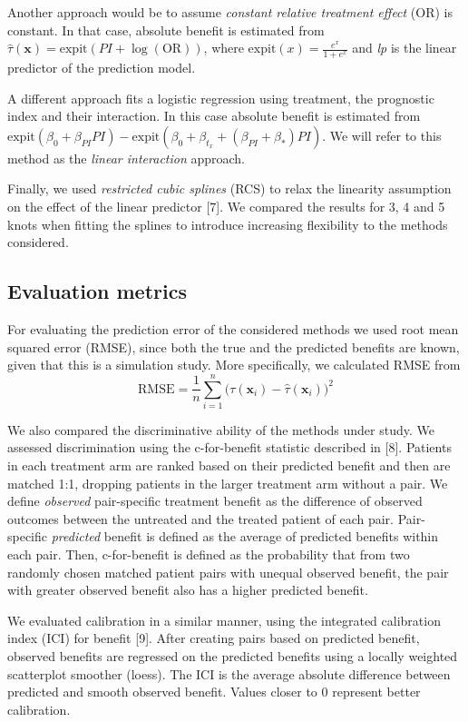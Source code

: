 \documentclass{article}
\begin{document}
Another approach would be to assume \emph{constant relative treatment
effect} (OR) is constant. In that case, absolute benefit is estimated
from \(\hat{\tau}(\bm{x}) = \text{expit}(PI +\log(\text{OR}))\), where
\(\text{expit}(x)=\frac{e^x}{1+e^x}\) and \emph{lp} is the linear
predictor of the prediction model.

A different approach fits a logistic regression using treatment, the
prognostic index and their interaction. In this case absolute benefit is
estimated from
\(\text{expit}(\beta_0+\beta_{PI}PI) - \text{expit}(\beta_0+\beta_{t_x}+(\beta_{PI}+\beta_*)PI)\).
We will refer to this method as the \emph{linear interaction} approach.

Finally, we used \emph{restricted cubic splines} (RCS) to relax the
linearity assumption on the effect of the linear predictor {[}7{]}. We
compared the results for 3, 4 and 5 knots when fitting the splines to
introduce increasing flexibility to the methods considered.

\hypertarget{evaluation-metrics}{%
\subsection{Evaluation metrics}\label{evaluation-metrics}}

For evaluating the prediction error of the considered methods we used
root mean squared error (RMSE), since both the true and the predicted
benefits are known, given that this is a simulation study. More
specifically, we calculated RMSE from
\[\text{RMSE}=\frac{1}{n}\sum_{i=1}^n\big(\tau(\bm{x}_i) - \hat{\tau}(\bm{x}_i)\big)^2\]

We also compared the discriminative ability of the methods under study.
We assessed discrimination using the c-for-benefit statistic described
in {[}8{]}. Patients in each treatment arm are ranked based on their
predicted benefit and then are matched 1:1, dropping patients in the
larger treatment arm without a pair. We define \emph{observed}
pair-specific treatment benefit as the difference of observed outcomes
between the untreated and the treated patient of each pair.
Pair-specific \emph{predicted} benefit is defined as the average of
predicted benefits within each pair. Then, c-for-benefit is defined as
the probability that from two randomly chosen matched patient pairs with
unequal observed benefit, the pair with greater observed benefit also
has a higher predicted benefit.

We evaluated calibration in a similar manner, using the integrated
calibration index (ICI) for benefit {[}9{]}. After creating pairs based
on predicted benefit, observed benefits are regressed on the predicted
benefits using a locally weighted scatterplot smoother (loess). The ICI
is the average absolute difference between predicted and smooth observed
benefit. Values closer to \(0\) represent better calibration.
\end{document}
